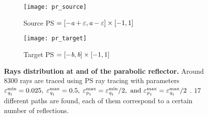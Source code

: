 \begin{figure}[h]
 \begin{subfigure}[h]{0.47\textwidth}
\centering
    \texttt{[image: pr\_source]}
    \caption{Source PS  $= [-\textit{a}+\varepsilon,\textit{a}-\varepsilon]\times[-1,1]$}
    \label{fig:source_triang_pr}
\end{subfigure}
\hfill
\begin{subfigure}[h]{0.47\textwidth}
\centering
    \texttt{[image: pr\_target]}
    \caption{Target PS  $= [-\textit{b},\textit{b}]\times[-1,1]$}
    \label{fig:target_triang_pr}
\end{subfigure}
\caption{\textbf{Rays distribution at  and  of the parabolic reflector.} Around $8300$ rays are traced using PS ray tracing with parameters $\varepsilon_{\textit{q}_1}^{\textrm{min}} = 0.025, \; \varepsilon_{\textit{q}_1}^{\textrm{max}} = 0.5, \; \varepsilon_{\textit{p}_1}^{\textrm{max}} = \varepsilon_{\textit{q}_1}^{\textrm{min}}/2, \mbox{ and }  \varepsilon_{\textit{p}_1}^{\textrm{max}} = \varepsilon_{\textit{q}_1}^{\textrm{max}}/2$ . $17$ different paths are found, each of them correspond to a certain number of reflections.}
 \label{fig:phase_space_pr}

\end{figure}
